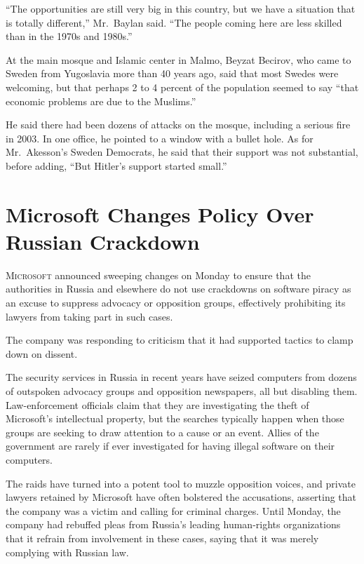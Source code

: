 ﻿\documentclass[12pt]{article}
\begin{document}
``The opportunities are still very big in this country, but we have a situation that is totally
different,'' Mr.~Baylan said. ``The people coming here are less skilled than in the 1970s and
1980s.''

At the main mosque and Islamic center in Malmo, Beyzat Becirov, who came to Sweden from Yugoslavia
more than 40 years ago, said that most Swedes were welcoming, but that perhaps 2 to 4 percent of the
population seemed to say ``that economic problems are due to the Muslims.''

He said there had been dozens of attacks on the mosque, including a serious fire in 2003. In one
office, he pointed to a window with a bullet hole. As for Mr.~Akesson's Sweden Democrats, he said
that their support was not substantial, before adding, ``But Hitler's support started small.''

\pagebreak
\section{Microsoft Changes Policy Over Russian Crackdown}

\lettrine{M}{icrosoft} announced sweeping changes on Monday to ensure that
the authorities in Russia and elsewhere do not use crackdowns on software piracy as an excuse to
suppress advocacy or opposition groups, effectively prohibiting its lawyers from taking part in such
cases.

The company was responding to criticism that it had supported tactics to clamp down on dissent.

The security services in Russia in recent years have seized computers from dozens of outspoken
advocacy groups and opposition newspapers, all but disabling them. Law-enforcement officials claim
that they are investigating the theft of Microsoft's intellectual property, but the searches
typically happen when those groups are seeking to draw attention to a cause or an event. Allies of
the government are rarely if ever investigated for having illegal software on their computers.

The raids have turned into a potent tool to muzzle opposition voices, and private lawyers retained
by Microsoft have often bolstered the accusations, asserting that the company was a victim and
calling for criminal charges. Until Monday, the company had rebuffed pleas from Russia's leading
human-rights organizations that it refrain from involvement in these cases, saying that it was
merely complying with Russian law.
\end{document}
